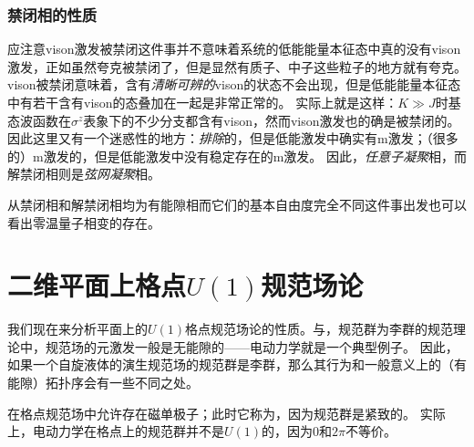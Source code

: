 \subsubsection{禁闭相的性质}

应注意vison激发被禁闭这件事并不意味着系统的低能能量本征态中真的没有vison激发，正如虽然夸克被禁闭了，但是显然有质子、中子这些粒子的地方就有夸克。
vison被禁闭意味着，含有\emph{清晰可辨的}vison的状态不会出现，但是低能能量本征态中有若干含有vison的态叠加在一起是非常正常的。
实际上就是这样：$K \gg J$时基态波函数在$\sigma^z$表象下的不少分支都含有vison，然而vison激发也的确是被禁闭的。
因此这里又有一个迷惑性的地方：\emph{排除}的，但是低能激发中确实有m激发；（很多的）m激发的，但是低能激发中没有稳定存在的m激发。
因此，\emph{任意子凝聚}相，而解禁闭相则是\emph{弦网凝聚}相。

从禁闭相和解禁闭相均为有能隙相而它们的基本自由度完全不同这件事出发也可以看出零温量子相变的存在。





\section{二维平面上格点$U(1)$规范场论}

我们现在来分析平面上的$U(1)$格点规范场论的性质。与，规范群为李群的规范理论中，规范场的元激发一般是无能隙的——电动力学就是一个典型例子。
因此，如果一个自旋液体的演生规范场的规范群是李群，那么其行为和一般意义上的（有能隙）拓扑序会有一些不同之处。

在格点规范场中允许存在磁单极子；此时它称为，因为规范群是紧致的。
实际上，电动力学在格点上的规范群并不是$U(1)$的，因为$0$和$2\pi$不等价。
